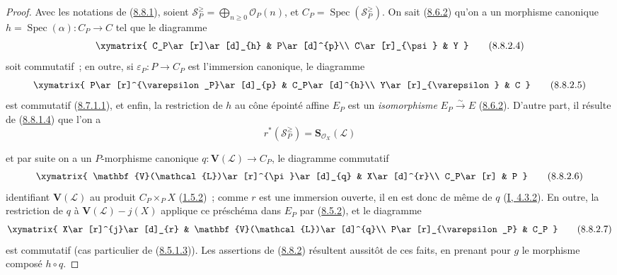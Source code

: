 \begin{proof}
Avec les notations de (\hyperref[II.8.8.1-fr]{8.8.1}), soient
$\mathcal{S}_P^{\geqslant}=\bigoplus_{n\geqslant 0}\mathcal{O}_P(n)$, et
$C_P=\operatorname{Spec}(\mathcal{S}_P^{\geqslant})$. On sait
(\hyperref[II.8.6.2-fr]{8.6.2}) qu'on a un morphisme canonique
$h=\operatorname{Spec}(\alpha):C_P\to C$ tel que le diagramme
\begin{equation}
\label{II.8.8.2.4-fr}
  \xymatrix{
    C_P\ar[r]\ar[d]_{h} & P\ar[d]^{p}\\
    C\ar[r]_{\psi} & Y
  }
\tag{8.8.2.4}
\end{equation}
soit commutatif~; en outre, si $\varepsilon_P:P\to C_P$ est l'immersion
canonique, le diagramme
\begin{equation}
\label{II.8.8.2.5-fr}
  \xymatrix{
    P\ar[r]^{\varepsilon_P}\ar[d]_{p} & C_P\ar[d]^{h}\\
    Y\ar[r]_{\varepsilon} & C
  }
\tag{8.8.2.5}
\end{equation}
est commutatif (\hyperref[II.8.7.1.1-fr]{8.7.1.1}), et enfin, la restriction
de $h$ au cône épointé affine $E_P$ est un \emph{isomorphisme}
$E_P\xrightarrow{\sim}E$ (\hyperref[II.8.6.2-fr]{8.6.2}). D'autre part, il
résulte de (\hyperref[II.8.8.1.4-fr]{8.8.1.4}) que l'on a
\[
  r^*(\mathcal{S}_P^{\geqslant})=
  \mathbf{S}_{\mathcal{O}_X}(\mathcal{L})
\]

et par suite on a un $P$-morphisme canonique
$q:\mathbf{V}(\mathcal{L})\to C_P$, le diagramme commutatif
\begin{equation}
\label{II.8.8.2.6-fr}
  \xymatrix{
    \mathbf{V}(\mathcal{L})\ar[r]^{\pi}\ar[d]_{q} & X\ar[d]^{r}\\
    C_P\ar[r] & P
  }
\tag{8.8.2.6}
\end{equation}
identifiant $\mathbf{V}(\mathcal{L})$ au produit $C_P\times_P X$
(\hyperref[II.1.5.2-fr]{1.5.2})~; comme $r$ est une immersion ouverte, il en
est donc de même de $q$ (\hyperref[I.4.3.2-fr]{I, 4.3.2}). En outre, la
restriction de $q$ à $\mathbf{V}(\mathcal{L})-j(X)$ applique ce préschéma dans
$E_P$ par (\hyperref[II.8.5.2-fr]{8.5.2}), et le diagramme
\begin{equation}
\label{II.8.8.2.7-fr}
  \xymatrix{
    X\ar[r]^{j}\ar[d]_{r} & \mathbf{V}(\mathcal{L})\ar[d]^{q}\\
    P\ar[r]_{\varepsilon_P} & C_P
  }
\tag{8.8.2.7}
\end{equation}
est commutatif (cas particulier de
(\hyperref[II.8.5.1.3-fr]{8.5.1.3})). Les assertions de
(\hyperref[II.8.8.2-fr]{8.8.2}) résultent aussitôt de ces faits, en prenant
pour $g$ le morphisme composé $h\circ q$.
\end{proof}

